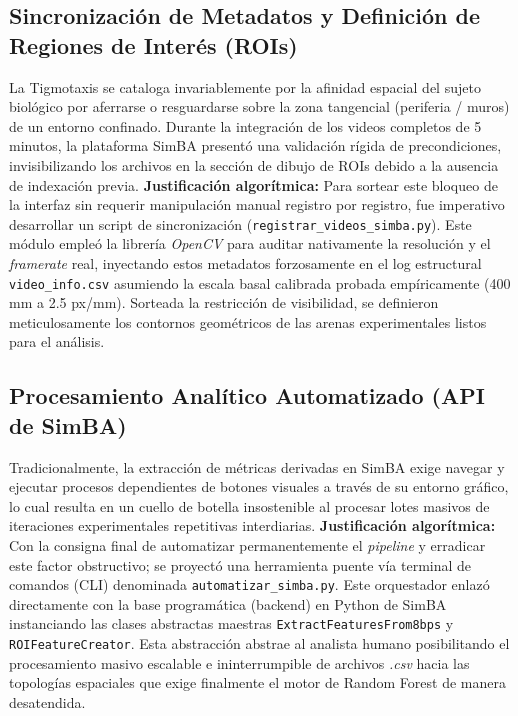 \documentclass[12pt,a4paper]{article}
\begin{document}
\subsection{Sincronización de Metadatos y Definición de Regiones de Interés (ROIs)}
La Tigmotaxis se cataloga invariablemente por la afinidad espacial del sujeto biológico por aferrarse o resguardarse sobre la zona tangencial (periferia / muros) de un entorno confinado. Durante la integración de los videos completos de 5 minutos, la plataforma SimBA presentó una validación rígida de precondiciones, invisibilizando los archivos en la sección de dibujo de ROIs debido a la ausencia de indexación previa. \textbf{Justificación algorítmica:} Para sortear este bloqueo de la interfaz sin requerir manipulación manual registro por registro, fue imperativo desarrollar un script de sincronización (\texttt{registrar\_videos\_simba.py}). Este módulo empleó la librería \textit{OpenCV} para auditar nativamente la resolución y el \textit{framerate} real, inyectando estos metadatos forzosamente en el log estructural \texttt{video\_info.csv} asumiendo la escala basal calibrada probada empíricamente (400 mm a 2.5 px/mm). Sorteada la restricción de visibilidad, se definieron meticulosamente los contornos geométricos de las arenas experimentales listos para el análisis.

\subsection{Procesamiento Analítico Automatizado (API de SimBA)}
Tradicionalmente, la extracción de métricas derivadas en SimBA exige navegar y ejecutar procesos dependientes de botones visuales a través de su entorno gráfico, lo cual resulta en un cuello de botella insostenible al procesar lotes masivos de iteraciones experimentales repetitivas interdiarias. \textbf{Justificación algorítmica:} Con la consigna final de automatizar permanentemente el \textit{pipeline} y erradicar este factor obstructivo; se proyectó una herramienta puente vía terminal de comandos (CLI) denominada \texttt{automatizar\_simba.py}.  Este orquestador enlazó directamente con la base programática (backend) en Python de SimBA instanciando las clases abstractas maestras \texttt{ExtractFeaturesFrom8bps} y \texttt{ROIFeatureCreator}. Esta abstracción abstrae al analista humano posibilitando el procesamiento masivo escalable e ininterrumpible de archivos \textit{.csv} hacia las topologías espaciales que exige finalmente el motor de Random Forest de manera desatendida.
\end{document}
